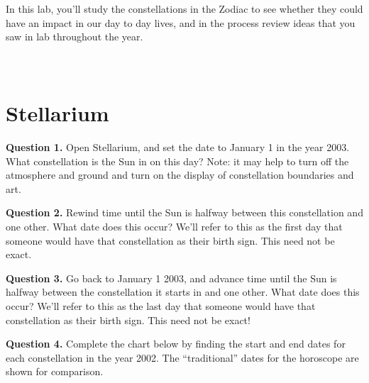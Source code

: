 \documentclass[11pt]{article}
\begin{document}
In this lab, you'll study the constellations in the Zodiac to see whether they could have an impact in our day to day lives, and in the process review ideas that you saw in lab throughout the year. \\ \\ \\


\newpage
\section{Stellarium}

\textbf{Question 1.} Open Stellarium, and set the date to January 1 in the year 2003. What constellation is the Sun in on this day? Note: it may help to turn off the atmosphere and ground and turn on the display of constellation boundaries and art.\\

\vspace{1.5cm}

\textbf{Question 2.} Rewind time until the Sun is halfway between this constellation and one other. What date does this occur? We'll refer to this as the first day that someone would have that constellation as their birth sign. This need not be exact.\\

\vspace{1.5cm}

\textbf{Question 3.} Go back to January 1 2003, and advance time until the Sun is halfway between the constellation it starts in and one other. What date does this occur? We'll refer to this as the last day that someone would have that constellation as their birth sign. This need not be exact!\\

\vspace{1.5cm}

\newpage

\textbf{Question 4.} Complete the chart below by finding the start and end dates for each constellation in the year 2002. The ``traditional'' dates for the horoscope are shown for comparison.\\
\end{document}
